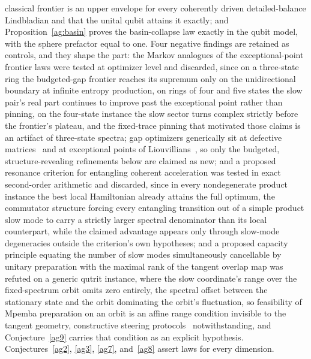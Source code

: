 \documentclass[11pt]{article}
\theoremstyle{definition}
\begin{document}
classical frontier is an upper envelope for every coherently driven detailed-balance Lindbladian and that the unital qubit attains it exactly; and Proposition~\ref{ag:basin} proves the basin-collapse law exactly in the qubit model, with the sphere prefactor equal to one.  Four negative findings are retained as controls, and they shape the part: the Markov analogues of the exceptional-point frontier laws were tested at optimizer level and discarded, since on a three-state ring the budgeted-gap frontier reaches its supremum only on the unidirectional boundary at infinite entropy production, on rings of four and five states the slow pair's real part continues to improve past the exceptional point rather than pinning, on the four-state instance the slow sector turns complex strictly before the frontier's plateau, and the fixed-trace pinning that motivated those claims is an artifact of three-state spectra; gap optimizers generically sit at defective matrices~\cite{BLO01} and at exceptional points of Liouvillians~\cite{ZWG23}, so only the budgeted, structure-revealing refinements below are claimed as new; and a proposed resonance criterion for entangling coherent acceleration was tested in exact second-order arithmetic and discarded, since in every nondegenerate product instance the best local Hamiltonian already attains the full optimum, the commutator structure forcing every entangling transition out of a simple product slow mode to carry a strictly larger spectral denominator than its local counterpart, while the claimed advantage appears only through slow-mode degeneracies outside the criterion's own hypotheses; and a proposed capacity principle equating the number of slow modes simultaneously cancellable by unitary preparation with the maximal rank of the tangent overlap map was refuted on a generic qutrit instance, where the slow coordinate's range over the fixed-spectrum orbit omits zero entirely, the spectral offset between the stationary state and the orbit dominating the orbit's fluctuation, so feasibility of Mpemba preparation on an orbit is an affine range condition invisible to the tangent geometry, constructive steering protocols~\cite{GMS26} notwithstanding, and Conjecture~\ref{ag9} carries that condition as an explicit hypothesis.  Conjectures~\ref{ag2}, \ref{ag3}, \ref{ag7}, and~\ref{ag8} assert laws for every dimension.
\end{document}
